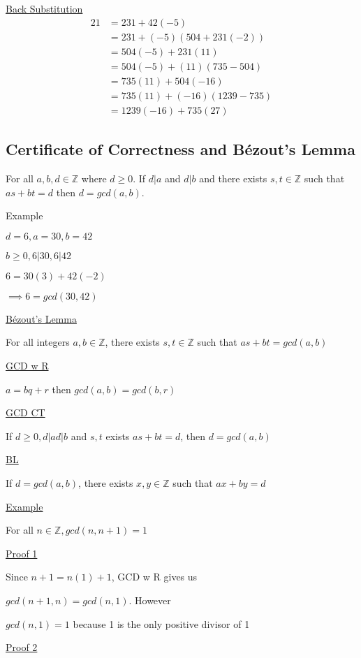 \documentclass{article}
\begin{document}
\underline{Back Substitution}
\begin{align*}
    21 &= 231 + 42(-5) \\
    &= 231 + (-5)(504 + 231(-2)) \\
    &= 504(-5) + 231(11) \\
    &= 504(-5) + (11)(735-504) \\
    &= 735(11) + 504(-16) \\
    &= 735(11) + (-16)(1239-735) \\
    &= 1239(-16) + 735(27)
\end{align*}

\subsection{Certificate of Correctness and Bézout's Lemma}

For all $a,b,d \in \mathbb{Z}$ where $d \ge 0$. If $d \vert a$ and $d \vert b$ and there exists $s, t \in \mathbb{Z}$ such that $as + bt = d$ then $d = gcd(a,b)$.

Example

$d = 6, a = 30, b = 42$

$b \ge 0, 6 \vert 30, 6 \vert 42$

$6 = 30(3) + 42(-2)$

$\implies 6 = gcd(30,42)$

\underline{Bézout's Lemma}

For all integers $a,b \in \mathbb{Z}$, there exists $s,t \in \mathbb{Z}$ such that $as + bt = gcd(a,b)$

\underline{GCD w R}

$a = bq + r$ then $gcd(a,b) = gcd(b,r)$

\underline{GCD CT}

If $d \ge 0, d \vert a d \vert b$ and $s,t$ exists $as + bt = d$, then $d = gcd(a,b)$

\underline{BL}

If $d = gcd(a,b)$, there exists $x,y \in \mathbb{Z}$ such that $ax + by = d$

\underline{Example}

For all $n \in \mathbb{Z}, gcd(n,n+1) = 1$

\underline{Proof 1}

Since $n+1 = n(1) + 1$, GCD w R gives us

$gcd(n+1, n) = gcd(n,1)$. However 

$gcd(n,1) = 1$ because 1 is the only positive divisor of 1

\underline{Proof 2}
\end{document}
